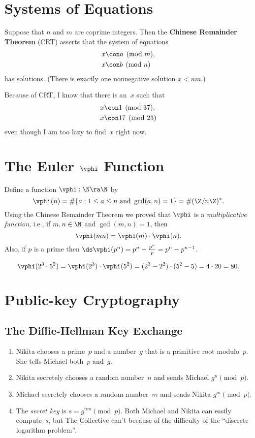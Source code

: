 \documentclass[11pt]{report}
\begin{document}
\section{Systems of Equations}
Suppose that $n$ and $m$ are coprime integers.  Then the
  {\bf Chinese Remainder Theorem} (CRT) asserts that the system of equations
\begin{align*}
  x & \con a \pmod{m}, \\
  x & \con b \pmod{n}
\end{align*}
has solutions.  (There is exactly one nonnegative solution $x<nm$.)
\begin{example}
  Because of CRT, I know that there is an~$x$ such that
  \begin{align*}
    x & \con 1\pmod{37}, \\
    x & \con 17\pmod{23}
  \end{align*}
  even though I am too lazy to find~$x$ right now.
\end{example}


\section{The Euler $\vphi$ Function}
Define a function $\vphi: \N \ra \N$ by
$$
  \vphi(n) = \#\{a : 1\leq a \leq  n \text{ and } \gcd(a,n) = 1\} = \#(\Z/n\Z)^*.
$$
Using the Chinese Remainder Theorem we proved that $\vphi$ is
a {\em multiplicative function}, i.e., if $m, n\in\N$ and $\gcd(m,n)=1$, then
$$\vphi(mn) = \vphi(m)\cdot \vphi(n).$$
Also, if $p$ is a prime
then $\ds \vphi(p^n) = p^n - \frac{p^n}{p} = p^n-p^{n-1}$.
\begin{example}
  $$\vphi(2^3\cdot 5^2) = \vphi(2^3)\cdot \vphi(5^2)
    = (2^3 - 2^2)\cdot (5^2-5) = 4\cdot 20 = 80.$$
\end{example}

\section{Public-key Cryptography}
\subsection{The Diffie-Hellman Key Exchange}
\begin{enumerate}
  \item Nikita chooses a prime~$p$ and a number~$g$
        that is a primitive root modulo~$p$.  She tells Michael both~$p$ and~$g$.
  \item Nikita secretely chooses a random number~$n$ and
        sends Michael $g^n\pmod{p}$.
  \item Michael secretely chooses a random number~$m$ and
        sends Nikita $g^m\pmod{p}$.
  \item The {\em secret key} is $s=g^{nm}\pmod{p}$.  Both
        Michael and Nikita can easily compute~$s$, but The Collective can't
        because of the difficulty of the ``discrete logarithm problem''.
\end{enumerate}
\end{document}
